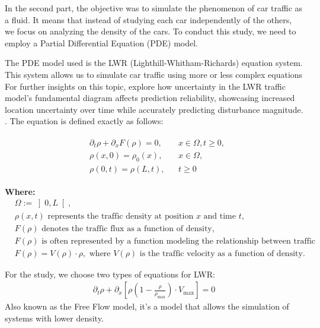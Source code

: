 \documentclass{article}
\begin{document}
		In the second part, the objective was to simulate the phenomenon of car traffic as a fluid. It means that instead of studying each car independently of the others, we focus on analyzing the density of the cars. To conduct this study, we need to employ a Partial Differential Equation (PDE) model.
		
		The PDE model used is the LWR  (Lighthill-Whitham-Richards) equation system. This system allows us to simulate car traffic using more or less complex equations For further insights on this topic, explore how uncertainty in the LWR traffic model's fundamental diagram affects prediction reliability, showcasing increased location uncertainty over time while accurately predicting disturbance magnitude. \cite{article}. The equation is defined exactly as follows:
		
		\begin{align*}\label{eq:PDE}
			\boxed{
				\begin{aligned}
					&\partial_t\rho + \partial_xF(\rho)=0, && x\in \Omega, t\ge 0,\\
					&\rho(x,0)=\rho_0(x), && x \in \Omega, \\
					&\rho(0,t)=\rho(L,t), && t\ge 0
			\end{aligned}}
		\end{align*}
		
		\textbf{Where:}
		\begin{align*}
			& \Omega := \left] 0,L\right[, \\
			& \rho(x,t) \text{ represents the traffic density at position } x \text{ and time } t, \\
			& F(\rho) \text{ denotes the traffic flux as a function of density,} \\
			& F(\rho) \text{ is often represented by a function modeling the relationship between traffic density and traffic velocity,} \\
			& F(\rho) = V(\rho) \cdot \rho, \text{ where } V(\rho) \text{ is the traffic velocity as a function of density}.
		\end{align*}
		
		For the study, we choose two types of equations for LWR:
		\begin{align}
			\partial_t\rho + \partial_x\left[ \rho\left( 1-\frac{\rho}{\rho_{\text{max}}}\right) \cdot V_{\text{max}}\right] = 0 
		\end{align}
		Also known as the Free Flow model, it's a model that allows the simulation of systems with lower density.
		
\end{document}
